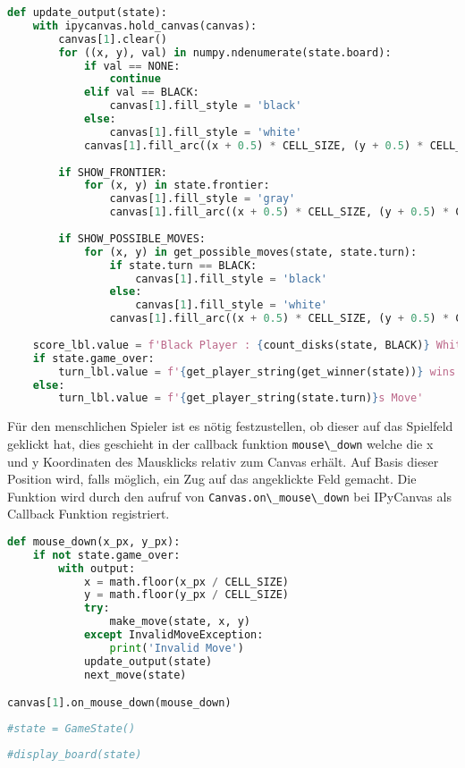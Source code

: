 \begin{lstlisting}[language=Python]
def update_output(state):
    with ipycanvas.hold_canvas(canvas):
        canvas[1].clear()
        for ((x, y), val) in numpy.ndenumerate(state.board):
            if val == NONE:
                continue
            elif val == BLACK:
                canvas[1].fill_style = 'black'
            else:
                canvas[1].fill_style = 'white'
            canvas[1].fill_arc((x + 0.5) * CELL_SIZE, (y + 0.5) * CELL_SIZE, CELL_SIZE / 2.2, 0, 2 * math.pi)
            
        if SHOW_FRONTIER:
            for (x, y) in state.frontier:
                canvas[1].fill_style = 'gray'
                canvas[1].fill_arc((x + 0.5) * CELL_SIZE, (y + 0.5) * CELL_SIZE, CELL_SIZE / 6, 0, 2 * math.pi)
        
        if SHOW_POSSIBLE_MOVES:
            for (x, y) in get_possible_moves(state, state.turn):
                if state.turn == BLACK:
                    canvas[1].fill_style = 'black'
                else:
                    canvas[1].fill_style = 'white'
                canvas[1].fill_arc((x + 0.5) * CELL_SIZE, (y + 0.5) * CELL_SIZE, CELL_SIZE / 6, 0, 2 * math.pi)
            
    score_lbl.value = f'Black Player : {count_disks(state, BLACK)} White Player : {count_disks(state, WHITE)}'
    if state.game_over:
        turn_lbl.value = f'{get_player_string(get_winner(state))} wins'
    else:
        turn_lbl.value = f'{get_player_string(state.turn)}s Move'
\end{lstlisting}

Für den menschlichen Spieler ist es nötig festzustellen, ob dieser auf
das Spielfeld geklickt hat, dies geschieht in der callback funktion
\passthrough{\lstinline!mouse\_down!} welche die x und y Koordinaten des
Mausklicks relativ zum Canvas erhält. Auf Basis dieser Position wird,
falls möglich, ein Zug auf das angeklickte Feld gemacht. Die Funktion
wird durch den aufruf von
\passthrough{\lstinline!Canvas.on\_mouse\_down!} bei IPyCanvas als
Callback Funktion registriert.

\begin{lstlisting}[language=Python]
def mouse_down(x_px, y_px):
    if not state.game_over:
        with output:
            x = math.floor(x_px / CELL_SIZE)
            y = math.floor(y_px / CELL_SIZE)
            try:
                make_move(state, x, y)
            except InvalidMoveException:
                print('Invalid Move')
            update_output(state)
            next_move(state)

canvas[1].on_mouse_down(mouse_down)
\end{lstlisting}

\begin{lstlisting}[language=Python]
#state = GameState()
\end{lstlisting}

\begin{lstlisting}[language=Python]
#display_board(state)
\end{lstlisting}
